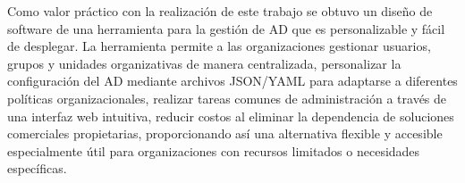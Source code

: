 Como valor práctico con la realización de este trabajo se obtuvo un diseño de software de una herramienta para la gestión de AD que es personalizable y fácil de desplegar. La herramienta permite a las organizaciones gestionar usuarios, grupos y unidades organizativas de manera centralizada, personalizar la configuración del AD mediante archivos JSON/YAML para adaptarse a diferentes políticas organizacionales, realizar tareas comunes de administración a través de una interfaz web intuitiva, reducir costos al eliminar la dependencia de soluciones comerciales propietarias, proporcionando así una alternativa flexible y accesible especialmente útil para organizaciones con recursos limitados o necesidades específicas.
